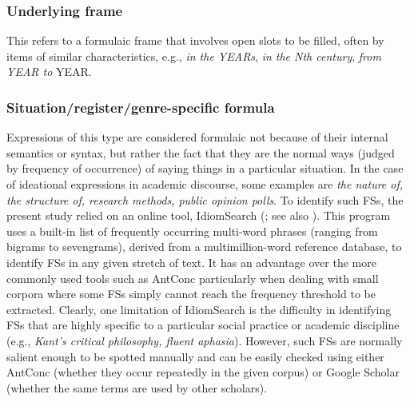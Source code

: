 \documentclass[output=paper]{langscibook}
\begin{document}
\subsubsection{Underlying frame \citep{Wray2008}}

This refers to a formulaic frame that involves open slots to be filled, often by items of similar characteristics, e.g., \textit{in the YEARs}, \textit{in the Nth century}, \textit{from YEAR to} YEAR.

\subsubsection{Situation/register/genre-specific formula \citep{Wray2008,Buerki2016}}

Expressions of this type are considered formulaic not because of their internal semantics or syntax, but rather the fact that they are the normal ways (judged by frequency of occurrence) of saying things in a particular situation. In the case of ideational expressions in academic discourse, some examples are \textit{the nature of, the structure of, research methods, public opinion polls}. To identify such FSs, the present study relied on an online tool, IdiomSearch (\citealt{Colson2016Idiom}; see also \citealt{Colson2016Set}). This program uses a built-in list of frequently occurring multi-word phrases (ranging from bigrams to sevengrams), derived from a multimillion-word reference database, to identify FSs in any given stretch of text. It has an advantage over the more commonly used tools such as AntConc particularly when dealing with small corpora where some FSs simply cannot reach the frequency threshold to be extracted. Clearly, one limitation of IdiomSearch is the difficulty in identifying FSs that are highly specific to a particular social practice or academic discipline (e.g., \textit{Kant’s critical philosophy, fluent aphasia}). However, such FSs are normally salient enough to be spotted manually and can be easily checked using either AntConc (whether they occur repeatedly in the given corpus) or Google Scholar (whether the same terms are used by other scholars).
\end{document}
